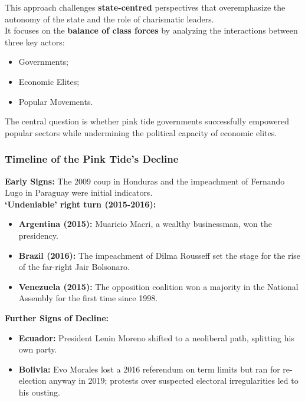 \documentclass{article}
\begin{document}
    \noindent This approach challenges \textbf{state-centred} perspectives
that overemphasize the autonomy of the state and the role of charismatic
leaders.\\

    \noindent It focuses on the \textbf{balance of class forces} by
analyzing the interactions between three key actors:
    \begin{itemize}
        \item Governments;
        \item Economic Elites;
        \item Popular Movements.
    \end{itemize}

    \noindent The central question is whether pink tide governments
successfully empowered popular sectors while undermining the political
capacity of economic elites.

    \subsubsection{Timeline of the Pink Tide's Decline}

    \noindent \textbf{Early Signs:} The 2009 coup in Honduras and the
impeachment of Fernando Lugo in Paraguay were initial indicators.\\

    \noindent \textbf{`Undeniable' right turn (2015-2016):}
    \begin{itemize}
        \item \textbf{Argentina (2015):} Muaricio Macri, a wealthy
        businessman, won the presidency.
        \item \textbf{Brazil (2016):} The impeachment of Dilma Rousseff set
        the stage for the rise of the far-right Jair Bolsonaro.
        \item \textbf{Venezuela (2015):} The opposition coalition won a
        majority in the National Assembly for the first time since 1998.
    \end{itemize}

    \noindent \textbf{Further Signs of Decline:}
    \begin{itemize}
        \item \textbf{Ecuador:} President Lenin Moreno shifted to a
        neoliberal path, splitting his own party.
        \item \textbf{Bolivia:} Evo Morales lost a 2016 referendum on term
        limits but ran for re-election anyway in 2019; protests over
        suspected electoral irregularities led to his ousting.
    \end{itemize}
\end{document}
